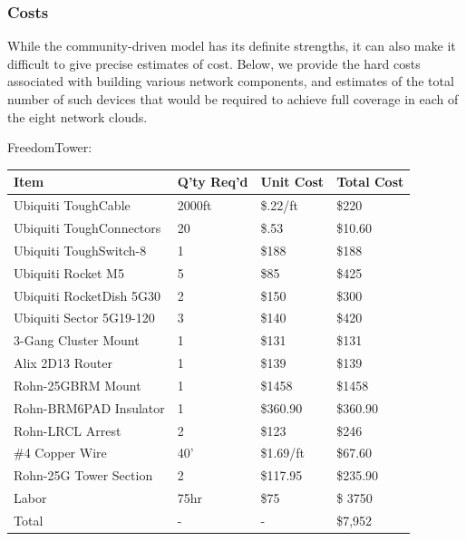 \subsubsection{Costs}
While the community-driven model has its definite strengths, it can also make it difficult to give precise estimates of cost. 
Below, we provide the hard costs associated with building various network components, and estimates of the total number of
such devices that would be required to achieve full coverage in each of the eight network clouds.\par

FreedomTower:
\begin{center}
\begin{tabular}{|p{5cm}|l|l|l|}
\hline
Item & Q'ty Req'd & Unit Cost & Total Cost \\ \hline
Ubiquiti ToughCable & 2000ft & \$.22/ft & \$220 \\ \hline
Ubiquiti ToughConnectors & 20 & \$.53 & \$10.60 \\ \hline
Ubiquiti ToughSwitch-8 & 1 & \$188 & \$188 \\ \hline
Ubiquiti Rocket M5 & 5 & \$85 & \$425 \\ \hline
Ubiquiti RocketDish 5G30 & 2 & \$150 & \$300 \\ \hline
Ubiquiti Sector 5G19-120 & 3 & \$140 & \$420 \\ \hline
3-Gang Cluster Mount & 1 & \$131 & \$131 \\ \hline
Alix 2D13 Router & 1 & \$139 & \$139 \\ \hline
Rohn-25GBRM Mount & 1 & \$1458 & \$1458 \\ \hline
Rohn-BRM6PAD Insulator & 1 & \$360.90 & \$360.90 \\ \hline
Rohn-LRCL Arrest & 2 & \$123 & \$246 \\ \hline
\#4 Copper Wire & 40' & \$1.69/ft  & \$67.60 \\ \hline
Rohn-25G Tower Section & 2 & \$117.95 & \$235.90 \\ \hline
Labor & 75hr & \$75 & \$ 3750 \\ \hline
Total & - & - & \$7,952 \\ \hline
\end{tabular}
\end{center}

